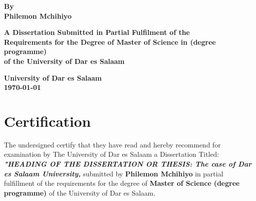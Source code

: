 \documentclass[a4paper, 12pt]{report}
\begin{document}
\begin{titlepage}

\centering
\fontsize{14.49998pt}{17pt} %

\vspace{4cm}
\textbf{ By \\ Philemon Mchihiyo %
\\[0.3cm]}

\justify

\begin{center}
\vspace{4cm}
\textbf{A Dissertation Submitted in Partial Fulfilment of the \\ Requirements for the Degree of
Master of Science in (degree programme) \\ %
of the University of Dar es Salaam}
\end{center}

\begin{center}
\vspace{2cm}
\textbf{University of Dar es Salaam \\
{\today}}
\end{center}
\end{titlepage}

\pagestyle{mystyle}

\chapter*{Certification}

The undersigned certify that they have read and hereby recommend for examination by The University of Dar es Salaam a Dissertation Titled: 
\textbf{\textit{"HEADING OF THE DISSERTATION OR THESIS: The case of Dar es Salaam University,}} %
submitted by \textbf{Philemon Mchihiyo} %
in partial fulfillment of the requirements for the degree of \textbf{Master of Science (degree programme)} %
of the University of Dar es Salaam.

\vspace{4cm}
\noindent
{} \\
\end{document}
